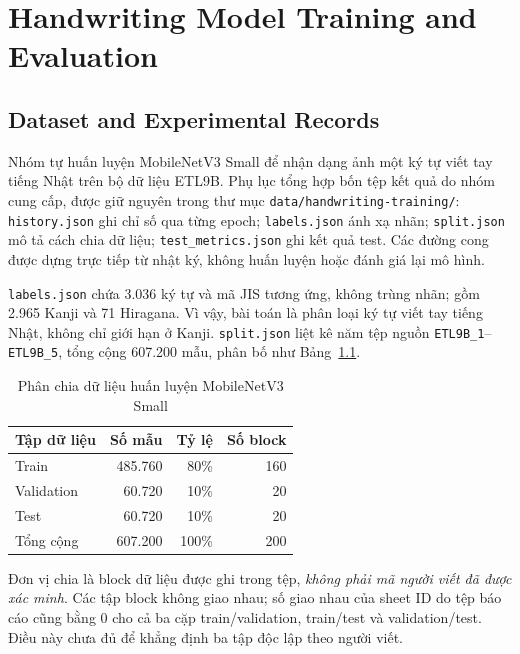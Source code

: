 \chapter{Handwriting Model Training and Evaluation}
\label{app:handwriting-training}

\section{Dataset and Experimental Records}

Nhóm tự huấn luyện MobileNetV3 Small để nhận dạng ảnh một ký tự viết tay tiếng Nhật trên bộ dữ liệu ETL9B. Phụ lục tổng hợp bốn tệp kết quả do nhóm cung cấp, được giữ nguyên trong thư mục \texttt{data/handwriting-training/}: \texttt{history.json} ghi chỉ số qua từng epoch; \texttt{labels.json} ánh xạ nhãn; \texttt{split.json} mô tả cách chia dữ liệu; \texttt{test\_metrics.json} ghi kết quả test. Các đường cong được dựng trực tiếp từ nhật ký, không huấn luyện hoặc đánh giá lại mô hình.

\texttt{labels.json} chứa 3.036 ký tự và mã JIS tương ứng, không trùng nhãn; gồm 2.965 Kanji và 71 Hiragana. Vì vậy, bài toán là phân loại ký tự viết tay tiếng Nhật, không chỉ giới hạn ở Kanji. \texttt{split.json} liệt kê năm tệp nguồn \texttt{ETL9B\_1}--\texttt{ETL9B\_5}, tổng cộng 607.200 mẫu, phân bố như Bảng~\ref{tab:handwriting-split}.

\begin{table}[htbp]
\centering
\caption{Phân chia dữ liệu huấn luyện MobileNetV3 Small}
\label{tab:handwriting-split}
\begin{tabular}{@{}lrrr@{}}
\toprule
\textbf{Tập dữ liệu} & \textbf{Số mẫu} & \textbf{Tỷ lệ} & \textbf{Số block} \\
\midrule
Train & 485.760 & 80\% & 160 \\
Validation & 60.720 & 10\% & 20 \\
Test & 60.720 & 10\% & 20 \\
\midrule
Tổng cộng & 607.200 & 100\% & 200 \\
\bottomrule
\end{tabular}
\end{table}

Đơn vị chia là block dữ liệu được ghi trong tệp, \emph{không phải mã người viết đã được xác minh}. Các tập block không giao nhau; số giao nhau của sheet ID do tệp báo cáo cũng bằng 0 cho cả ba cặp train/validation, train/test và validation/test. Điều này chưa đủ để khẳng định ba tập độc lập theo người viết.

